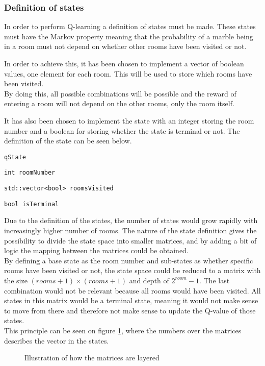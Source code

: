 \documentclass[../Head/Main.tex]{subfiles}
\begin{document}
\subsubsection{Definition of states}
In order to perform Q-learning a definition of states must be made. These states must have the Markov property meaning that the probability of a marble being in a room must not depend on whether other rooms have been visited or not.\par 
In order to achieve this, it has been chosen to implement a vector of boolean values, one element for each room. This will be used to store which rooms have been visited.\\
By doing this, all possible combinations will be possible and the reward of entering a room will not depend on the other rooms, only the room itself.\par 
It has also been chosen to implement the state with an integer storing the room number and a boolean for storing whether the state is terminal or not. The definition of the state can be seen below.
\begin{Indentation}
	\item \texttt{qState} \vspace{-2pt}
	\begin{Indentation}
		\item \texttt{int roomNumber} \vspace{-2pt}
		\item \texttt{std::vector<bool> roomsVisited} \vspace{-2pt}
		\item \texttt{bool isTerminal}
	\end{Indentation}
\end{Indentation}
Due to the definition of the states, the number of states would grow rapidly with increasingly higher number of rooms. The nature of the state definition gives the possibility to divide the state space into smaller matrices, and by adding a bit of logic the mapping between the matrices could be obtained.\\
By defining a base state as the room number and sub-states as whether specific rooms have been visited or not, the state space could be reduced to a matrix with the size $(rooms + 1)\times(rooms + 1)$ and depth of $2^{room}-1$. The last combination would not be relevant because all rooms would have been visited. All states in this matrix would be a terminal state, meaning it would not make sense to move from there and therefore not make sense to update the Q-value of those states.\\
This principle can be seen on figure \ref{fig:3D-matrix}, where the numbers over the matrices describes the vector in the states.  
\begin{figure}[H]
	\centering
	\scalebox{0.9}
	{
		
	}
	\caption{Illustration of how the matrices are layered}
	\label{fig:3D-matrix}
\end{figure}
\end{document}
